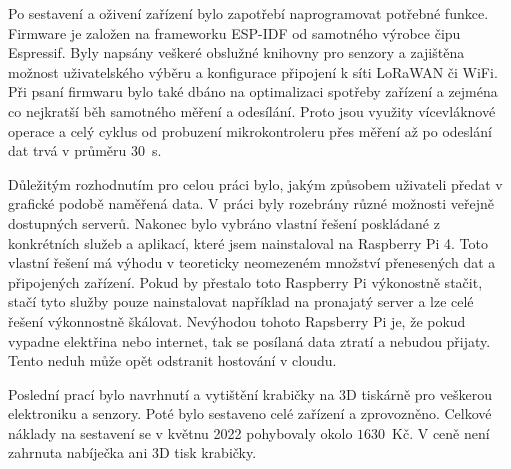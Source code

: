Po sestavení a oživení zařízení bylo zapotřebí naprogramovat potřebné funkce. Firmware je založen na frameworku ESP-IDF od samotného výrobce čipu Espressif. Byly napsány veškeré obslužné knihovny pro senzory a zajištěna možnost uživatelského výběru a konfigurace připojení k síti LoRaWAN či WiFi. Při psaní firmwaru bylo také dbáno na optimalizaci spotřeby zařízení a zejména co nejkratší běh samotného měření a odesílání. Proto jsou využity vícevláknové operace a celý cyklus od probuzení mikrokontroleru přes měření až po odeslání dat trvá v průměru \SI{30}{\second}.

Důležitým rozhodnutím pro celou práci bylo, jakým způsobem uživateli předat v grafické podobě naměřená data. V práci byly rozebrány různé možnosti veřejně dostupných serverů. Nakonec bylo vybráno vlastní řešení poskládané z konkrétních služeb a aplikací, které jsem nainstaloval na Raspberry Pi 4. Toto vlastní řešení má výhodu v teoreticky neomezeném množství přenesených dat a připojených zařízení. Pokud by přestalo toto Raspberry Pi výkonostně stačit, stačí tyto služby pouze nainstalovat například na pronajatý server a lze celé řešení výkonnostně škálovat. Nevýhodou tohoto Rapsberry Pi je, že pokud vypadne elektřina nebo internet, tak se posílaná data ztratí a nebudou přijaty. Tento neduh může opět odstranit hostování v cloudu.

Poslední prací bylo navrhnutí a vytištění krabičky na 3D tiskárně pro veškerou elektroniku a senzory. Poté bylo sestaveno celé zařízení a zprovozněno. Celkové náklady na sestavení se v květnu 2022 pohybovaly okolo $1630$~Kč. V ceně není zahrnuta nabíječka ani 3D tisk krabičky.